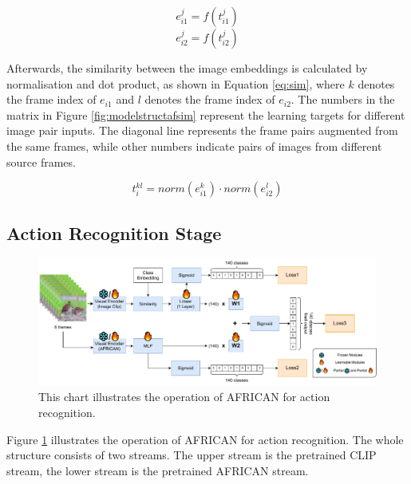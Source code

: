 \begin{equation}
    \label{eq:enc1}
    e_{i1}^j = f(t_{i1}^j)
\end{equation}
\begin{equation}
    \label{eq:enc2}
    e_{i2}^j = f(t_{i2}^j)
\end{equation}

Afterwards, the similarity between the image embeddings is calculated by normalisation and dot product, as shown in Equation \ref{eq:sim}, where $k$ denotes the frame index of $e_{i1}$ and $l$ denotes the frame index of $e_{i2}$. The numbers in the matrix in Figure \ref{fig:modelstructafsim} represent the learning targets for different image pair inputs. The diagonal line represents the frame pairs augmented from the same frames, while other numbers indicate pairs of images from different source frames. 

\begin{equation}
    \label{eq:sim}
    t_{i}^{kl} = norm(e_{i1}^{k}) \cdot norm(e_{i2}^{l})
\end{equation}




\subsection{Action Recognition Stage}

\begin{figure}[ht]
    \centering
    \includegraphics[width=1.0\textwidth]{assets/imgs/3_4_ModelStructureAF}
    \caption[Operation of AFRICAN for action recognition]{This chart illustrates the operation of AFRICAN for action recognition.}
    \label{fig:modelstructaf_ar}
\end{figure}

Figure \ref{fig:modelstructaf_ar} illustrates the operation of AFRICAN for action recognition. The whole structure consists of two streams. The upper stream is the pretrained CLIP stream, the lower stream is the pretrained AFRICAN stream. 

